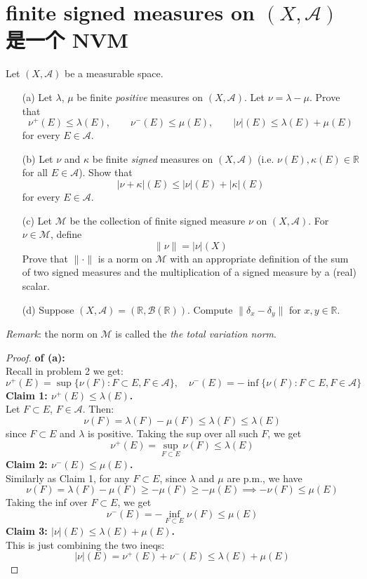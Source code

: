 \documentclass[lang=cn,11pt]{elegantbook}
\begin{document}
\section{finite signed measures on $(X,\mathcal{A})$ 是一个 NVM}
  Let $(X, \mathcal{A})$ be a measurable space. 
  \begin{itemize}
  \item[(a)]Let $\lambda$, $\mu$ be finite \emph{positive} measures on $(X, \mathcal{A})$. 
    Let $\nu=\lambda-\mu$. Prove that   \begin{equation*}
      \nu^+(E)\le \lambda(E), \qquad \nu^-(E)\le \mu(E), \qquad |\nu|(E)\le \lambda(E)+\mu(E)
  \end{equation*}
  for every $E\in \mathcal{A}$.
\item[(b)]Let $\nu$ and $\kappa$ be finite \emph{signed} measures on $(X, \mathcal{A})$ (i.e.  $\nu(E),\kappa(E)\in\mathbb{R}$ for all $E\in\mathcal{A}$).  Show that 
\[
  |\nu+\kappa|(E) \le |\nu|(E)+|\kappa|(E) 
\]
for every $E\in \mathcal{A}$. 
\item[(c)] Let $\mathcal{M}$ be the collection of finite signed measure $\nu$ on $(X,\mathcal{A})$. 
  For $\nu\in \mathcal{M}$, define   \[
    \| \nu\|= |\nu|(X)
  \]
  Prove that $\|\cdot\|$ is a norm on $\mathcal{M}$ with an appropriate definition of the sum of two signed measures and the multiplication of a signed measure by a (real) scalar. 
\item[(d)] Suppose $(X,\mathcal{A})=(\mathbb{R},\mathcal{B}(\mathbb{R}))$. Compute $\|\delta_x-\delta_y\|$ for $x,y\in\mathbb{R}$.
\end{itemize}

\textit{Remark}: the norm on $\mathcal{M}$ is called the \emph{the total variation norm}.


\begin{proof}
    \textbf{of (a):}\\
Recall in problem 2 we get:
\[
\nu^+(E) = \sup\{ \nu(F) : F \subset E, F \in \mathcal{A} \}, \quad 
\nu^-(E) = -\inf\{ \nu(F) : F \subset E, F \in \mathcal{A} \}
\]
\textbf{Claim 1: $\nu^+(E)\le \lambda(E)$.}\\
Let \(F \subset E\), \(F \in \mathcal{A}\). Then:
\[
\nu(F) = \lambda(F) - \mu(F) \le \lambda(F) \le \lambda(E)
\]
since \(F \subset E\) and \(\lambda\) is positive.  
Taking the sup over all such \(F\), we get
\[
\nu^+(E) = \sup_{F \subset E} \nu(F) \le \lambda(E)
\]\textbf{Claim 2: $ \nu^-(E)\le \mu(E)$.}\\
Similarly as Claim 1, for any \(F \subset E\), since $\lambda$ and $\mu$ are p.m., we have
\[
\nu(F) = \lambda(F) - \mu(F) \ge -\mu(F) \ge -\mu(E)
\implies -\nu(F) \le \mu(E)
\]
Taking the inf over $F \subset E$, we get
\[
\nu^-(E) = -\inf_{F \subset E} \nu(F) \le \mu(E)
\]
\textbf{Claim 3: $|\nu|(E)\le \lambda(E)+\mu(E)$.}\\
This is just combining the two ineqs:  \[
|\nu|(E) = \nu^+(E) + \nu^-(E) \le \lambda(E) + \mu(E)
\]
\end{proof}
\end{document}
